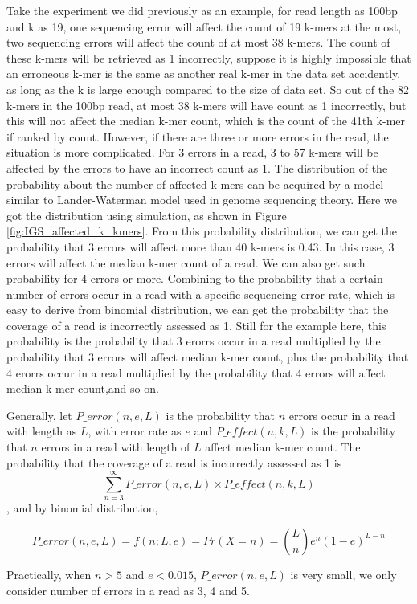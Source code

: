 \documentclass[12pt]{report}
\begin{document}
Take the experiment we did
previously as an example, for read length as 100bp and k as 19, one sequencing
error will affect the count of 19 k-mers at the most, two sequencing errors
will affect the count of at most 38 k-mers. The count of these k-mers will be
retrieved as 1 incorrectly, suppose it is highly impossible that an erroneous
k-mer is the same as another real k-mer in the data set accidently, as long as
the k is large enough compared to the size of data set. So out of the 82 k-mers
in the 100bp read, at most 38 k-mers will have count as 1 incorrectly, but this
will not affect the median k-mer count, which is the count of the 41th k-mer if
ranked by count. However, if there are three or more errors in the read, the 
situation is more complicated. For 3 errors in a read, 3 to 57 k-mers
will be affected by the errors to have an incorrect count as 1. The 
distribution of the probability about the number of affected k-mers can be
acquired by a model similar to Lander-Waterman model used in genome sequencing
 theory. Here we got the distribution using simulation, as shown in Figure
\ref{fig:IGS_affected_k_kmers}. From this probability distribution, we can get
the probability that 3 errors will affect more than 40 k-mers is 0.43. In this
case, 3 errors will affect the median k-mer count of a read. We can also get 
such probability for 4 errors or more. Combining to the probability that a
certain number of errors occur in a read with a specific sequencing error rate,
which is easy to derive from binomial distribution, we can get the probability
that the coverage of a read is incorrectly assessed as 1. Still for the example
here, this probability is the probability that 3 erorrs occur in a read
multiplied by the probability that 3 errors will affect median k-mer count,
plus the probability that 4 erorrs occur in a read multiplied by the 
probability that 4 errors will affect median k-mer count,and so on.

Generally, let $P\_error(n,e,L)$ is the probability that $n$ errors occur in a 
read with length as $L$, with error rate as $e$ and $P\_effect(n,k,L)$ is the 
probability that $n$ 
errors in a read with length of $L$ affect median k-mer count. The probability 
that the coverage of a read is incorrectly assessed as 1 is 
\[\sum_{n=3}^{\infty} P\_error(n,e,L) \times P\_effect(n,k,L)  \],
and by binomial distribution,

\[P\_error(n,e,L) = f(n;L,e) = Pr(X=n) = {L \choose n}e^n(1-e)^{L-n} \] 

Practically, when $n>5$ and $e<0.015$, $P\_error(n,e,L)$ is very small, we only consider
number of errors in a read as 3, 4 and 5.
\end{document}
